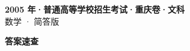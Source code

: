 \documentclass[zihao=-4, a4paper]{ctexart}
\begin{document}
\begin{center}
  {\Large\bfseries 2005 年·普通高等学校招生考试·重庆卷·文科}\\[4pt]
  {\large 数学 · 简答版}
\end{center}
\medskip
{}

\clearpage
{}
\begin{center}{\Large\bfseries 答案速查}\end{center}
\medskip

\end{document}
